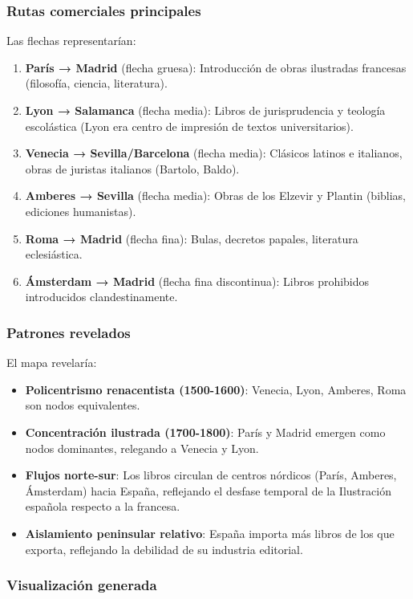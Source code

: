 \documentclass[11pt,a4paper]{article}
\begin{document}
\subsubsection{Rutas comerciales principales}

Las flechas representarían:
\begin{enumerate}
\item \textbf{París → Madrid} (flecha gruesa): Introducción de obras ilustradas francesas (filosofía, ciencia, literatura).
\item \textbf{Lyon → Salamanca} (flecha media): Libros de jurisprudencia y teología escolástica (Lyon era centro de impresión de textos universitarios).
\item \textbf{Venecia → Sevilla/Barcelona} (flecha media): Clásicos latinos e italianos, obras de juristas italianos (Bartolo, Baldo).
\item \textbf{Amberes → Sevilla} (flecha media): Obras de los Elzevir y Plantin (biblias, ediciones humanistas).
\item \textbf{Roma → Madrid} (flecha fina): Bulas, decretos papales, literatura eclesiástica.
\item \textbf{Ámsterdam → Madrid} (flecha fina discontinua): Libros prohibidos introducidos clandestinamente.
\end{enumerate}

\subsubsection{Patrones revelados}

El mapa revelaría:
\begin{itemize}
\item \textbf{Policentrismo renacentista (1500-1600)}: Venecia, Lyon, Amberes, Roma son nodos equivalentes.
\item \textbf{Concentración ilustrada (1700-1800)}: París y Madrid emergen como nodos dominantes, relegando a Venecia y Lyon.
\item \textbf{Flujos norte-sur}: Los libros circulan de centros nórdicos (París, Amberes, Ámsterdam) hacia España, reflejando el desfase temporal de la Ilustración española respecto a la francesa.
\item \textbf{Aislamiento peninsular relativo}: España importa más libros de los que exporta, reflejando la debilidad de su industria editorial.
\end{itemize}

\subsubsection{Visualización generada}
\end{document}
